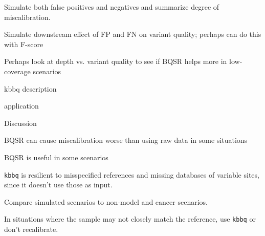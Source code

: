 \documentclass{article}
\begin{document}
\begin{outline}
\begin{outline}
\begin{outline}
		\end{outline}	
		\item Simulate both false positives and negatives and summarize degree of miscalibration.
		\item Simulate downstream effect of FP and FN on variant quality; perhaps can do this with F-score
		\item Perhaps look at depth vs. variant quality to see if BQSR helps more in low-coverage scenarios
		\item kbbq description
		\item application
	\end{outline}
	\item Discussion
	\begin{outline}
		\item BQSR can cause miscalibration worse than using raw data in some situations
		\item BQSR is useful in some scenarios
		\item \texttt{kbbq} is resilient to misspecified references and missing databases of variable sites, since it doesn't use those as input.
		\item Compare simulated scenarios to non-model and cancer scenarios.
		\begin{outline}
			\item In situations where the sample may not closely match the reference, use \texttt{kbbq} or don't recalibrate.
		\end{outline}
	\end{outline}
\end{outline}
\end{document}
